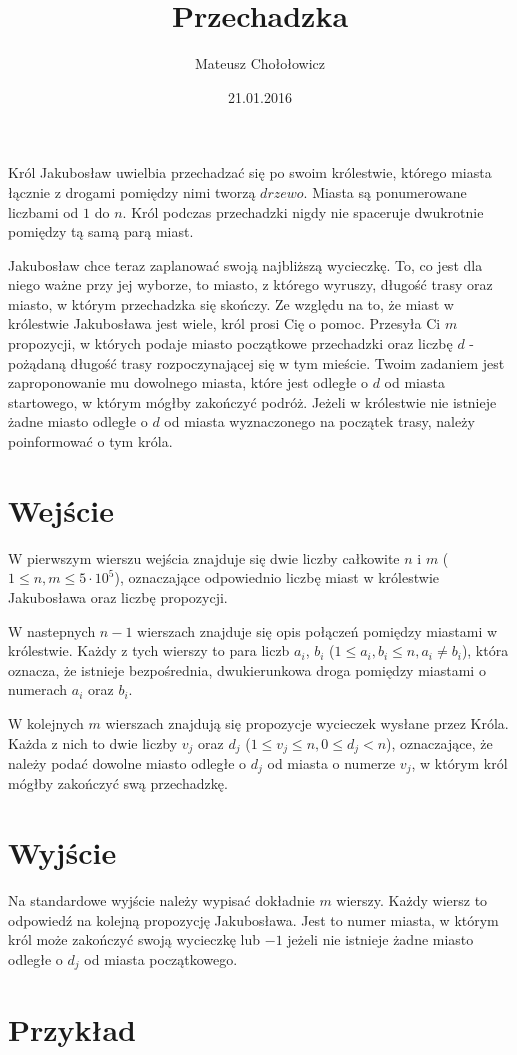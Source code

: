 \documentclass[zad,zawodnik,utf8]{sinol}
\title{Przechadzka}
\author{Mateusz Chołołowicz} %
\date{21.01.2016}
\begin{document}
  \begin{tasktext}%
Król Jakubosław uwielbia przechadzać się po swoim królestwie, którego miasta łącznie z drogami
pomiędzy nimi tworzą $drzewo$. Miasta są ponumerowane liczbami od $1$ do $n$. 
Król podczas przechadzki nigdy nie spaceruje dwukrotnie pomiędzy tą samą
parą miast.


Jakubosław chce teraz zaplanować swoją najbliższą wycieczkę. To, co jest dla niego ważne przy jej wyborze,
to miasto, z którego wyruszy, długość trasy oraz miasto, w którym przechadzka się skończy. Ze względu na to,
że miast w królestwie Jakubosława jest wiele, król prosi Cię o pomoc. Przesyła Ci $m$ propozycji, w których podaje
miasto początkowe przechadzki oraz liczbę $d$ - pożądaną długość trasy rozpoczynającej się w tym mieście. 
Twoim zadaniem jest zaproponowanie mu
dowolnego miasta, które jest odległe o $d$ od miasta startowego, w którym mógłby zakończyć podróż. 
Jeżeli w królestwie nie istnieje żadne miasto odległe o $d$ od miasta wyznaczonego na początek trasy, należy poinformować o tym króla.

 \section{Wejście}
    
W pierwszym wierszu wejścia znajduje się dwie liczby całkowite $n$ i $m$ ($1 \leq n, m \leq 5 \cdot 10^5$), oznaczające odpowiednio 
liczbę miast w królestwie Jakubosława oraz liczbę propozycji. 

W nastepnych $n-1$ wierszach znajduje się opis połączeń pomiędzy miastami
w królestwie. Każdy z tych wierszy to para liczb $a_i$, $b_i$ ($1 \leq a_i, b_i \leq n, a_i \neq b_i$), która oznacza, że istnieje
bezpośrednia, dwukierunkowa droga pomiędzy miastami o numerach $a_i$ oraz $b_i$.

W kolejnych $m$ wierszach znajdują się propozycje wycieczek wysłane przez Króla. Każda z nich to dwie liczby $v_j$ oraz $d_j$
($1 \leq v_j \leq n, 0 \leq d_j < n$), oznaczające, że należy podać dowolne miasto odległe o $d_j$
od miasta o numerze $v_j$, w którym król mógłby zakończyć swą przechadzkę.

  \section{Wyjście}
    Na standardowe wyjście należy wypisać dokładnie $m$ wierszy. Każdy wiersz to odpowiedź na kolejną propozycję Jakubosława.
    Jest to numer miasta, w którym król może zakończyć swoją wycieczkę lub $-1$ jeżeli nie istnieje żadne miasto odległe o $d_j$
    od miasta początkowego.
    
    \section{Przykład}
    

  \end{tasktext}
\end{document}
